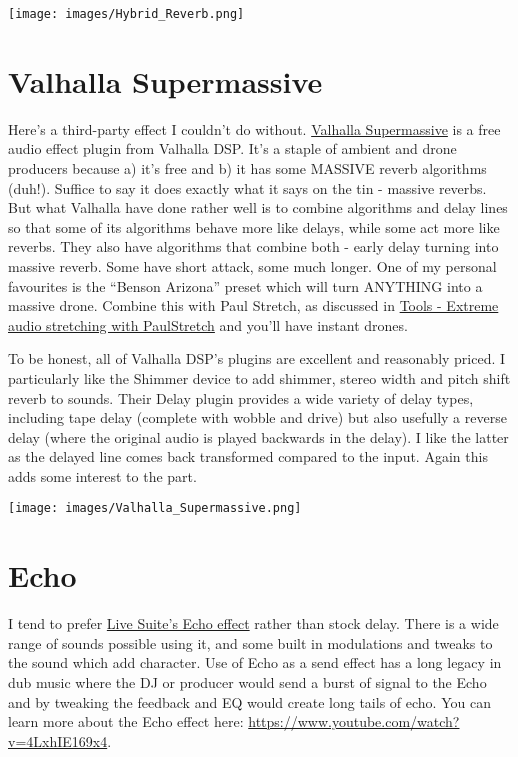 \documentclass[
  12pt,
  letterpaper,
  oneside,
  open=any]{scrbook}
\begin{document}
\texttt{[image: images/Hybrid\_Reverb.png]}

\section{Valhalla Supermassive}\label{valhalla-supermassive}

Here's a third-party effect I couldn't do without.
\href{https://valhalladsp.com/shop/reverb/valhalla-supermassive/}{Valhalla
Supermassive} is a free audio effect plugin from Valhalla DSP. It's a
staple of ambient and drone producers because a) it's free and b) it has
some MASSIVE reverb algorithms (duh!). Suffice to say it does exactly
what it says on the tin - massive reverbs. But what Valhalla have done
rather well is to combine algorithms and delay lines so that some of its
algorithms behave more like delays, while some act more like reverbs.
They also have algorithms that combine both - early delay turning into
massive reverb. Some have short attack, some much longer. One of my
personal favourites is the ``Benson Arizona'' preset which will turn
ANYTHING into a massive drone. Combine this with Paul Stretch, as
discussed in \hyperref[Chapter-016-Tools-PaulStretch]{Tools - Extreme
audio stretching with PaulStretch} and you'll have instant drones.

To be honest, all of Valhalla DSP's plugins are excellent and reasonably
priced. I particularly like the Shimmer device to add shimmer, stereo
width and pitch shift reverb to sounds. Their Delay plugin provides a
wide variety of delay types, including tape delay (complete with wobble
and drive) but also usefully a reverse delay (where the original audio
is played backwards in the delay). I like the latter as the delayed line
comes back transformed compared to the input. Again this adds some
interest to the part.

\texttt{[image: images/Valhalla\_Supermassive.png]}

\section{Echo}\label{echo}

I tend to prefer
\href{https://www.ableton.com/en/live-manual/12/live-audio-effect-reference/\#echo}{Live
Suite's Echo effect} rather than stock delay. There is a wide range of
sounds possible using it, and some built in modulations and tweaks to
the sound which add character. Use of Echo as a send effect has a long
legacy in dub music where the DJ or producer would send a burst of
signal to the Echo and by tweaking the feedback and EQ would create long
tails of echo. You can learn more about the Echo effect here:
\url{https://www.youtube.com/watch?v=4LxhIE169x4}.
\end{document}

